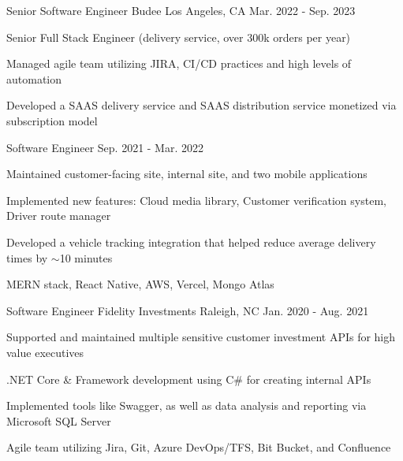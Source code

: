 

\begin{cventries}


    \cventry
    {Senior Software Engineer} 
    {Budee} 
    {Los Angeles, CA} 
    {Mar. 2022 - Sep. 2023}
    {
      \begin{cvitems} 
        \item {Senior Full Stack Engineer (delivery service, over 300k orders per year)}
        \item {Managed agile team utilizing JIRA, CI/CD practices and high levels of automation}
        \item {Developed a SAAS delivery service and SAAS distribution service monetized via subscription model}
        \end{cvitems}
 	}


  \cventry
    {Software Engineer}
    {} %
    {} %
    {Sep. 2021 - Mar. 2022} %
    {
      \begin{cvitems}
        \item {Maintained customer-facing site, internal site, and two mobile applications}
        \item {Implemented new features: Cloud media library, Customer verification system, Driver route manager}
        \item {Developed a vehicle tracking integration that helped reduce average delivery times by $\sim$10 minutes}
        \item {MERN stack, React Native, AWS, Vercel, Mongo Atlas}
        \end{cvitems}
 	}


  \cventry
    {Software Engineer} %
    {Fidelity Investments} %
    {Raleigh, NC} %
    {Jan. 2020 - Aug. 2021} %
    {
      \begin{cvitems} %
        \item {Supported and maintained multiple sensitive customer investment APIs for high value executives}
        \item {.NET Core \& Framework development using C\# for creating  internal APIs}
        \item {Implemented tools like Swagger, as well as data analysis and reporting via Microsoft SQL Server}
        \item {Agile team utilizing Jira, Git, Azure DevOps/TFS, Bit Bucket, and Confluence}
      \end{cvitems}
    }
    
\end{cventries}
